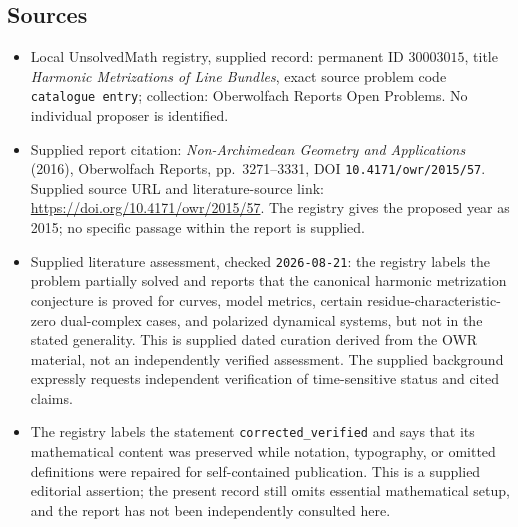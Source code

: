 \documentclass[11pt]{article}
\begin{document}
\subsection{Sources}
\begin{itemize}
\item Local UnsolvedMath registry, supplied record: permanent ID \(30003015\), title \emph{Harmonic Metrizations of Line Bundles}, exact source problem code \texttt{catalogue entry}; collection: Oberwolfach Reports Open Problems. No individual proposer is identified.
\item Supplied report citation: \emph{Non-Archimedean Geometry and Applications} (2016), Oberwolfach Reports, pp.\ 3271--3331, DOI \texttt{10.4171/owr/2015/57}. Supplied source URL and literature-source link: \url{https://doi.org/10.4171/owr/2015/57}. The registry gives the proposed year as 2015; no specific passage within the report is supplied.
\item Supplied literature assessment, checked \texttt{2026-08-21}: the registry labels the problem partially solved and reports that the canonical harmonic metrization conjecture is proved for curves, model metrics, certain residue-characteristic-zero dual-complex cases, and polarized dynamical systems, but not in the stated generality. This is supplied dated curation derived from the OWR material, not an independently verified assessment. The supplied background expressly requests independent verification of time-sensitive status and cited claims.
\item The registry labels the statement \texttt{corrected\_verified} and says that its mathematical content was preserved while notation, typography, or omitted definitions were repaired for self-contained publication. This is a supplied editorial assertion; the present record still omits essential mathematical setup, and the report has not been independently consulted here.
\end{itemize}
\end{document}
